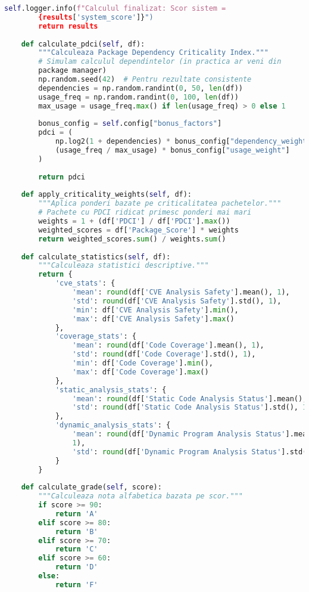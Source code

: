 \documentclass[12pt,a4paper]{article}
\begin{document}
\begin{lstlisting}[language=Python, caption=Script real pentru calcularea scorului de securitate (security\_calculator.py), label=lst:real_security_calculator]
        self.logger.info(f"Calculul finalizat: Scor sistem = 
        {results['system_score']}")
        return results
    
    def calculate_pdci(self, df):
        """Calculeaza Package Dependency Criticality Index."""
        # Simulam calculul dependintelor (in practica ar veni din 
        package manager)
        np.random.seed(42)  # Pentru rezultate consistente
        dependencies = np.random.randint(0, 50, len(df))
        usage_freq = np.random.randint(0, 100, len(df))
        max_usage = usage_freq.max() if len(usage_freq) > 0 else 1
        
        bonus_config = self.config["bonus_factors"]
        pdci = (
            np.log2(1 + dependencies) * bonus_config["dependency_weight"] +
            (usage_freq / max_usage) * bonus_config["usage_weight"]
        )
        
        return pdci
    
    def apply_criticality_weights(self, df):
        """Aplica ponderi bazate pe criticalitatea pachetelor."""
        # Pachete cu PDCI ridicat primesc ponderi mai mari
        weights = 1 + (df['PDCI'] / df['PDCI'].max())
        weighted_scores = df['Package_Score'] * weights
        return weighted_scores.sum() / weights.sum()
    
    def calculate_statistics(self, df):
        """Calculeaza statistici descriptive."""
        return {
            'cve_stats': {
                'mean': round(df['CVE Analysis Safety'].mean(), 1),
                'std': round(df['CVE Analysis Safety'].std(), 1),
                'min': df['CVE Analysis Safety'].min(),
                'max': df['CVE Analysis Safety'].max()
            },
            'coverage_stats': {
                'mean': round(df['Code Coverage'].mean(), 1),
                'std': round(df['Code Coverage'].std(), 1),
                'min': df['Code Coverage'].min(),
                'max': df['Code Coverage'].max()
            },
            'static_analysis_stats': {
                'mean': round(df['Static Code Analysis Status'].mean(), 1),
                'std': round(df['Static Code Analysis Status'].std(), 1)
            },
            'dynamic_analysis_stats': {
                'mean': round(df['Dynamic Program Analysis Status'].mean(),
                1),
                'std': round(df['Dynamic Program Analysis Status'].std(), 1)
            }
        }
    
    def calculate_grade(self, score):
        """Calculeaza nota alfabetica bazata pe scor."""
        if score >= 90:
            return 'A'
        elif score >= 80:
            return 'B'
        elif score >= 70:
            return 'C'
        elif score >= 60:
            return 'D'
        else:
            return 'F'
    

\end{lstlisting}
\end{document}
